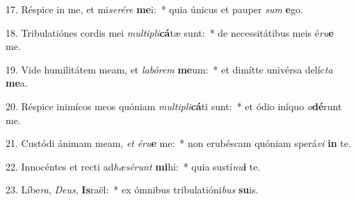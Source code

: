 17. Réspice in me, et mi\textit{se}\textit{ré}\textit{re} \textbf{me}i:~*  quia únicus et pauper \textit{sum} \textbf{e}go.\

18. Tribulatiónes cordis mei \textit{mul}\textit{ti}\textit{pli}\textbf{cá}tæ sunt:~*  de necessitátibus meis é\textit{ru}\textbf{e} me.\

19. Vide humilitátem meam, et \textit{la}\textit{bó}\textit{rem} \textbf{me}um:~*  et dimítte univérsa delíc\textit{ta} \textbf{me}a.\

20. Réspice inimícos meos quóniam \textit{mul}\textit{ti}\textit{pli}\textbf{cá}ti sunt:~*  et ódio iníquo \textit{o}\textbf{dé}runt me.\

21. Custódi ánimam meam, \textit{et} \textit{é}\textit{ru}\textbf{e} me:~*  non erubéscam quóniam sperá\textit{vi} \textbf{in} te.\

22. Innocéntes et recti ad\textit{hæ}\textit{sé}\textit{runt} \textbf{mi}hi:~*  quia sustí\textit{nu}\textbf{i} te.\

23. Líbe\textit{ra}, \textit{De}\textit{us}, \textbf{Is}raël:~*  ex ómnibus tribulatióni\textit{bus} \textbf{su}is.\

